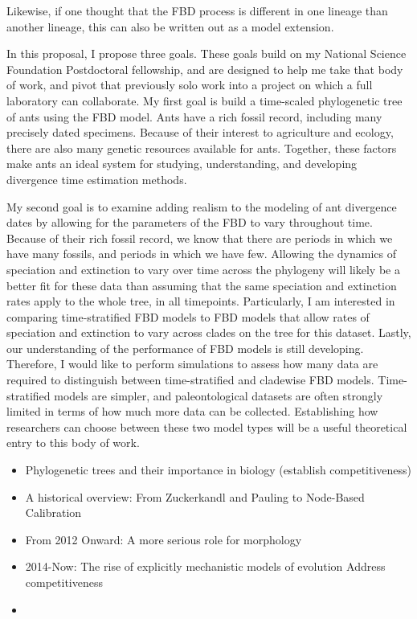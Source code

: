 \documentclass[]{article}
\begin{document}
Likewise, if one thought that the FBD process is different in one lineage than another lineage, this can also be written out as a model extension.\par
In this proposal, I propose three goals.
These goals build on my National Science Foundation Postdoctoral fellowship, and are designed to help me take that body of work, and pivot that previously solo work into a project on which a full laboratory can collaborate.
My first goal is build a time-scaled phylogenetic tree of ants using the FBD model. 
Ants have a rich fossil record, including many precisely dated specimens.
Because of their interest to agriculture and ecology, there are also many genetic resources available for ants.
Together, these factors make ants an ideal system for studying, understanding, and developing divergence time estimation methods. \par

My second goal is to examine adding realism to the modeling of ant divergence dates by allowing for the parameters of the FBD to vary throughout time.
Because of their rich fossil record, we know that there are periods in which we have many fossils, and periods in which we have few.
Allowing the dynamics of speciation and extinction to vary over time across the phylogeny will likely be a better fit for these data than assuming that the same speciation and extinction rates apply to the whole tree, in all timepoints.
Particularly, I am interested in comparing time-stratified FBD models to FBD models that allow rates of speciation and extinction to vary across clades on the tree for this dataset.
Lastly, our understanding of the performance of FBD models is still developing. 
Therefore, I would like to perform simulations to assess how many data are required to distinguish between time-stratified and cladewise FBD models.
Time-stratified models are simpler, and paleontological datasets are often strongly limited in terms of how much more data can be collected.
Establishing how researchers can choose between these two model types will be a useful theoretical entry to this body of work. \par




\begin{itemize}
\item Phylogenetic trees and their importance in biology (establish competitiveness)
\item A historical overview: From Zuckerkandl and Pauling to Node-Based Calibration
\item From 2012 Onward: A more serious role for morphology
\item 2014-Now: The rise of explicitly mechanistic models of evolution
\subitem Address competitiveness
\item 
\end{itemize}
\end{document}
